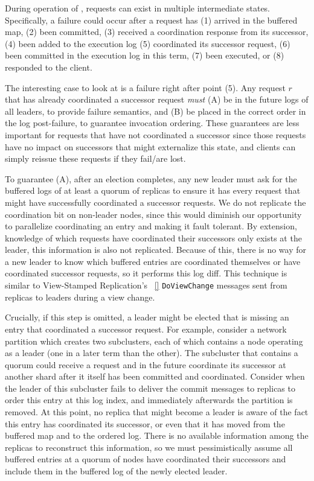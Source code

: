 During operation of \protocol, requests can exist in multiple intermediate states. Specifically, a failure could occur after a request has (1) arrived in the buffered map, (2) been committed, (3) received a coordination response from its successor, (4) been added to the execution log (5) coordinated its successor request, (6) been committed in the execution log in this term, (7) been executed, or (8) responded to the client. 

The interesting case to look at is a failure right after point (5). Any request $r$ that has already coordinated a successor request \textit{must} (A) be in the future logs of all leaders, to provide failure semantics, and (B) be placed in the correct order in the log post-failure, to guarantee invocation ordering. These guarantees are less important for requests that have not coordinated a successor since those requests have no impact on successors that might externalize this state, and clients can simply reissue these requests if they fail/are lost. 

To guarantee (A), after an election completes, any new leader must ask for the buffered logs of at least a quorum of replicas to ensure it has every request that might have successfully coordinated a successor requests. We do not replicate the coordination bit on non-leader nodes, since this would diminish our opportunity to parallelize coordinating an entry and making it fault tolerant. By extension, knowledge of which requests have coordinated their successors only exists at the leader, this information is also not replicated. Because of this, there is no way for a new leader to know which buffered entries are coordinated themselves or have coordinated successor requests, so it performs this log diff. This technique is similar to View-Stamped Replication's ~\ref{} \texttt{DoViewChange} messages sent from replicas to leaders during a view change. 

Crucially, if this step is omitted, a leader might be elected that is missing an entry that coordinated a successor request. For example, consider a network partition which creates two subclusters, each of which contains a node operating as a leader (one in a later term than the other). The subcluster that contains a quorum could receive a request and in the future coordinate its successor at another shard after it itself has been committed and coordinated. Consider when the leader of this subcluster fails to deliver the commit messages to replicas to order this entry at this log index, and immediately afterwards the partition is removed. At this point, no replica that might become a leader is aware of the fact this entry has coordinated its successor, or even that it has moved from the buffered map and to the ordered log. There is no available information among the replicas to reconstruct this information, so we must pessimistically assume all buffered entries at a quorum of nodes have coordinated their successors and include them in the buffered log of the newly elected leader.

